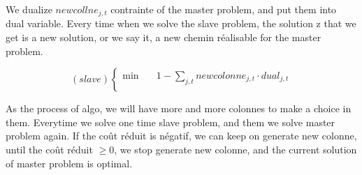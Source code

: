 \documentclass[a4paper]{article}
\begin{document}
We dualize $newcollne_{j,t}$ contrainte of the master problem, and put them into dual variable.  Every time when we solve the slave problem, the solution z that we get is a new solution, or we say it, a new chemin réalisable for the master problem.

\begin{equation*}
    (slave) \left\{ 
    \begin{aligned}
    \min\quad  & 1-\sum_{j,t} newcolonne_{j,t}\cdot dual_{j,t}\\
  \end{aligned}
\right.
\end{equation*}

As the process of algo, we will have more and more colonnes to make a choice in them. Everytime we solve one time slave problem, and them we solve master problem again. If the coût réduit is négatif, we can keep on generate new colonne, until the coût réduit $\geq$0, we stop generate new colonne, and the current solution of master problem is optimal.
\end{document}
